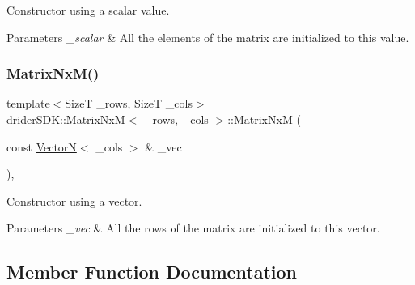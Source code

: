 Constructor using a scalar value.


\begin{DoxyParams}{Parameters}
{\em \+\_\+scalar} & All the elements of the matrix are initialized to this value. \\
\hline
\end{DoxyParams}
\mbox{\label{classdrider_s_d_k_1_1_matrix_nx_m_adecea1304622d1824e5e8a02eaba9479}} 
\subsubsection{\texorpdfstring{Matrix\+Nx\+M()}{MatrixNxM()}\hspace{0.1cm}{\footnotesize\ttfamily [3/3]}}
{\footnotesize\ttfamily template$<$SizeT \+\_\+rows, SizeT \+\_\+cols$>$ \\
\hyperlink{classdrider_s_d_k_1_1_matrix_nx_m}{drider\+S\+D\+K\+::\+Matrix\+NxM}$<$ \+\_\+rows, \+\_\+cols $>$\+::\hyperlink{classdrider_s_d_k_1_1_matrix_nx_m}{Matrix\+NxM} (\begin{DoxyParamCaption}\item[{const \hyperlink{classdrider_s_d_k_1_1_vector_n}{VectorN}$<$ \+\_\+cols $>$ \&}]{\+\_\+vec }\end{DoxyParamCaption})\hspace{0.3cm}{\ttfamily [inline]}, {\ttfamily [explicit]}}

Constructor using a vector.


\begin{DoxyParams}{Parameters}
{\em \+\_\+vec} & All the rows of the matrix are initialized to this vector. \\
\hline
\end{DoxyParams}


\subsection{Member Function Documentation}
\mbox{\label{classdrider_s_d_k_1_1_matrix_nx_m_a16d44a7c5d163643f24133ad5f32946d}} 

